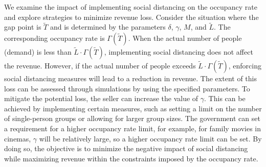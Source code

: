 We examine the impact of implementing social distancing on the occupancy rate and explore strategies to minimize revenue loss. Consider the situation where the gap point is $\tilde{T}$ and is determined by the parameters $\delta$, $\gamma$, $M$, and $\tilde{L}$. The corresponding occupancy rate is $\Gamma(\tilde{T})$. When the actual number of people (demand) is less than $\tilde{L} \cdot \Gamma(\tilde{T})$, implementing social distancing does not affect the revenue. However, if the actual number of people exceeds $\tilde{L} \cdot \Gamma(\tilde{T})$, enforcing social distancing measures will lead to a reduction in revenue. The extent of this loss can be assessed through simulations by using the specified parameters. To mitigate the potential loss, the seller can increase the value of $\gamma$. This can be achieved by implementing certain measures, such as setting a limit on the number of single-person groups or allowing for larger group sizes. The government can set a requirement for a higher occupancy rate limit, for example, for family movies in cinemas, $\gamma$ will be relatively large, so a higher occupancy rate limit can be set. By doing so, the objective is to minimize the negative impact of social distancing while maximizing revenue within the constraints imposed by the occupancy rate.
